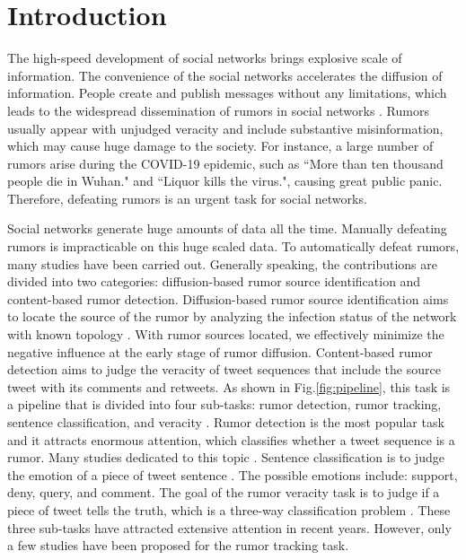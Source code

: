 \section{Introduction}
\label{sec:introduction}
The high-speed development of social networks brings explosive scale of information. The convenience of the social networks accelerates the diffusion of information. People create and publish messages without any limitations, which leads to the widespread dissemination of rumors in social networks \cite{DBLP:journals/corr/KurkaGZ15, DBLP:journals/csur/ZubiagaABLP18, DBLP:conf/sirocco/KostkaOW08, vosoughi2018spread}. Rumors usually appear with unjudged veracity and include substantive misinformation, which may cause huge damage to the society. For instance, a large number of rumors arise during the COVID-19 epidemic, such as ``More than ten thousand people die in Wuhan." and ``Liquor kills the virus.", causing great public panic. Therefore, defeating rumors is an urgent task for social networks.

Social networks generate huge amounts of data all the time. Manually defeating rumors is impracticable on this huge scaled data. To automatically defeat rumors, many studies have been carried out. Generally speaking, the contributions are divided into two categories:  diffusion-based rumor source identification and content-based rumor detection. Diffusion-based rumor source identification aims to locate the source of the rumor by analyzing the infection status of the network with known topology \cite{DBLP:conf/sigmetrics/ShahZ10, DBLP:journals/tit/ShahZ11, DBLP:conf/kdd/LappasTGM10}. With rumor sources located, we effectively minimize the negative influence at the early stage of rumor diffusion. Content-based rumor detection aims to judge the veracity of tweet sequences that include the source tweet with its comments and retweets. As shown in Fig.\ref{fig:pipeline}, this task is a pipeline that is divided into four sub-tasks: rumor detection, rumor tracking, sentence classification, and veracity \cite{DBLP:journals/csur/ZubiagaABLP18, DBLP:conf/coling/KochkinaLZ18}. Rumor detection is the most popular task and it attracts enormous attention, which classifies whether a tweet sequence is a rumor. Many studies dedicated to this topic \cite{DBLP:conf/socinfo/ZubiagaLP17, DBLP:conf/www/Ma0W19,DBLP:conf/naacl/NguyenDCD19, DBLP:journals/corr/abs-1906-05659}. Sentence classification is to judge the emotion of a piece of tweet sentence \cite{DBLP:conf/semeval/EnayetE17, DBLP:conf/semeval/X17a, DBLP:conf/coling/ZubiagaKLPL16}. The possible emotions include: support, deny, query, and comment. The goal of the rumor veracity task is to judge if a piece of tweet tells the truth, which is a three-way classification problem \cite{DBLP:conf/coling/KochkinaLZ18, DBLP:conf/acl/LiZS19, DBLP:conf/acl/KumarC19}. These three sub-tasks have attracted extensive attention in recent years. However, only a few studies have been proposed for the rumor tracking task.

